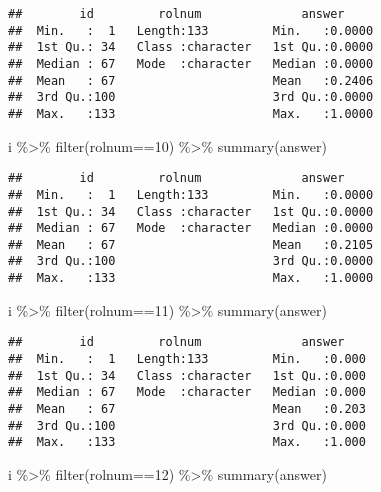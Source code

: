 \documentclass[
]{article}
\newenvironment{Shaded}{\begin{snugshade}}{\end{snugshade}}
\newcommand{\DecValTok}[1]{\textcolor[rgb]{0.00,0.00,0.81}{#1}}
\newcommand{\FunctionTok}[1]{\textcolor[rgb]{0.00,0.00,0.00}{#1}}
\newcommand{\NormalTok}[1]{#1}
\newcommand{\SpecialCharTok}[1]{\textcolor[rgb]{0.00,0.00,0.00}{#1}}
\begin{document}
\begin{enumerate}
\begin{verbatim}
##        id         rolnum              answer      
##  Min.   :  1   Length:133         Min.   :0.0000  
##  1st Qu.: 34   Class :character   1st Qu.:0.0000  
##  Median : 67   Mode  :character   Median :0.0000  
##  Mean   : 67                      Mean   :0.2406  
##  3rd Qu.:100                      3rd Qu.:0.0000  
##  Max.   :133                      Max.   :1.0000
\end{verbatim}

\begin{Shaded}
\begin{Highlighting}[]
\NormalTok{i }\SpecialCharTok{\%\textgreater{}\%} \FunctionTok{filter}\NormalTok{(rolnum}\SpecialCharTok{==}\DecValTok{10}\NormalTok{) }\SpecialCharTok{\%\textgreater{}\%} \FunctionTok{summary}\NormalTok{(answer)}
\end{Highlighting}
\end{Shaded}

\begin{verbatim}
##        id         rolnum              answer      
##  Min.   :  1   Length:133         Min.   :0.0000  
##  1st Qu.: 34   Class :character   1st Qu.:0.0000  
##  Median : 67   Mode  :character   Median :0.0000  
##  Mean   : 67                      Mean   :0.2105  
##  3rd Qu.:100                      3rd Qu.:0.0000  
##  Max.   :133                      Max.   :1.0000
\end{verbatim}

\begin{Shaded}
\begin{Highlighting}[]
\NormalTok{i }\SpecialCharTok{\%\textgreater{}\%} \FunctionTok{filter}\NormalTok{(rolnum}\SpecialCharTok{==}\DecValTok{11}\NormalTok{) }\SpecialCharTok{\%\textgreater{}\%} \FunctionTok{summary}\NormalTok{(answer)}
\end{Highlighting}
\end{Shaded}

\begin{verbatim}
##        id         rolnum              answer     
##  Min.   :  1   Length:133         Min.   :0.000  
##  1st Qu.: 34   Class :character   1st Qu.:0.000  
##  Median : 67   Mode  :character   Median :0.000  
##  Mean   : 67                      Mean   :0.203  
##  3rd Qu.:100                      3rd Qu.:0.000  
##  Max.   :133                      Max.   :1.000
\end{verbatim}

\begin{Shaded}
\begin{Highlighting}[]
\NormalTok{i }\SpecialCharTok{\%\textgreater{}\%} \FunctionTok{filter}\NormalTok{(rolnum}\SpecialCharTok{==}\DecValTok{12}\NormalTok{) }\SpecialCharTok{\%\textgreater{}\%} \FunctionTok{summary}\NormalTok{(answer)}
\end{Highlighting}
\end{Shaded}


\end{enumerate}
\end{document}
